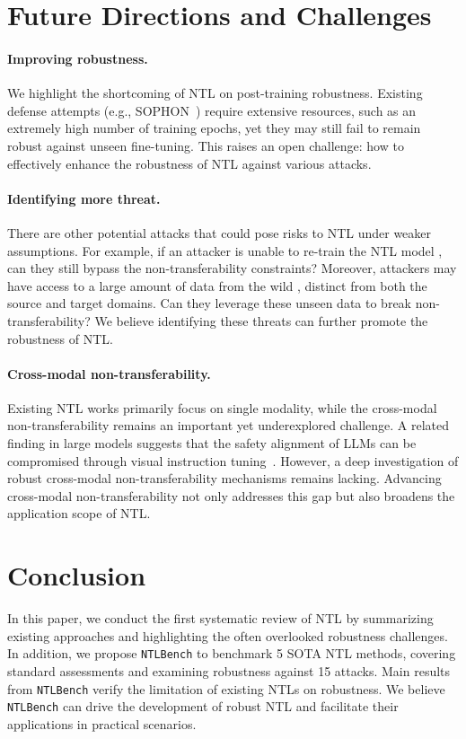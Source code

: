 \section{Future Directions and Challenges}
\label{sec:future}

\paragraph{Improving robustness.} We highlight the shortcoming of NTL on post-training robustness.
Existing defense attempts (e.g., SOPHON~\cite{deng2024sophon}) require extensive resources, such as an extremely high number of training epochs, yet they may still fail to remain robust against unseen fine-tuning. This raises an open challenge: how to effectively enhance the robustness of NTL against various attacks.
\paragraph{Identifying more threat.}
There are other potential attacks that could pose risks to NTL under weaker assumptions. For example, if an attacker is unable to re-train the NTL model \cite{hu2023learning,guo2023scale}, can they still bypass the non-transferability constraints? Moreover, attackers may have access to a large amount of data from the wild \cite{chen2021learning}, distinct from both the source and target domains. Can they leverage these unseen data to break non-transferability? We believe identifying these threats can further promote the robustness of NTL.
\paragraph{Cross-modal non-transferability.} Existing NTL works primarily focus on single modality, while the cross-modal non-transferability remains an important yet underexplored challenge. A related finding in large models suggests that the safety alignment of LLMs can be compromised through visual instruction tuning~\cite{zong2024safety,liu2023visual}. 
However, a deep investigation of robust cross-modal non-transferability mechanisms remains lacking.
Advancing cross-modal non-transferability not only addresses this gap but also broadens the application scope of NTL.



\section{Conclusion}
In this paper, we conduct the first systematic review of NTL by summarizing existing approaches and highlighting the often overlooked robustness challenges. 
In addition, we propose \texttt{NTLBench} to benchmark 5 SOTA NTL methods, covering standard assessments and examining robustness against 15 attacks. 
Main results from \texttt{NTLBench} verify the limitation of existing NTLs on robustness.
We believe \texttt{NTLBench} can drive the development of robust NTL and facilitate their applications in practical scenarios. 
